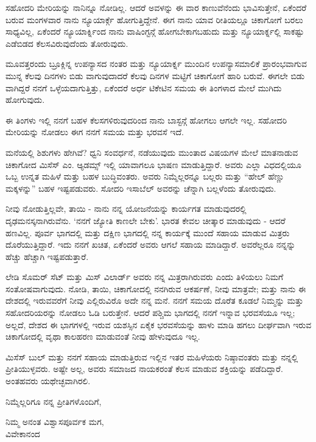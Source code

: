 ಸಹೋದರಿ ಮೇರಿಯನ್ನು ನಾನಿನ್ನೂ ನೋಡಿಲ್ಲ. ಆದರೆ ಅವಳನ್ನು ಈ ವಾರ ಕಾಣುವೆನೆಂದು ಭಾವಿಸುತ್ತೇನೆ, ಏಕೆಂದರೆ ಬರುವ ಮಂಗಳವಾರ ನಾನು ನ್ಯೂಯಾರ್ಕ್ಗೆ ಹೋಗುತ್ತಿದ್ದೇನೆ. ಈಗ ನಾನು ಯಾವ ರೀತಿಯಲ್ಲೂ ಚಿಕಾಗೋಗೆ ಬರಲು ಸಾಧ್ಯವಿಲ್ಲ, ಏಕೆಂದರೆ ನ್ಯೂಯಾರ್ಕ್ನಿಂದ ನಾನು ವಾಷಿಂಗ್ಟನ್ಗೆ ಹೋಗಬೇಕಾಗಬಹುದು ಮತ್ತು ನ್ಯೂಯಾರ್ಕ್ನಲ್ಲಿ ಸಾಕಷ್ಟು ಎಡೆಬಿಡದ ಕೆಲಸವಿರುವುದೆಂದು ತೋರುವುದು.

ಮೂವತ್ತರಂದು ಬ್ರೂಕ್ಲಿನ್ನ ಉಪನ್ಯಾಸದ ನಂತರ ಮತ್ತು ನ್ಯೂಯಾರ್ಕ್ನ ಮುಂದಿನ ಉಪನ್ಯಾಸಮಾಲಿಕೆ ಪ್ರಾರಂಭವಾಗುವ ಮುನ್ನ ಕೆಲವು ದಿನಗಳು ಬಿಡು ವಾಗುವುದಾದರೆ ಕೆಲವು ದಿನಗಳ ಮಟ್ಟಿಗೆ ಚಿಕಾಗೋಗೆ ಹಾರಿ ಬರುವೆ. ಈಗಲೇ ಬಿಡು ವಾಗಿದ್ದರೆ ನನಗೆ ಒಳ್ಳೆಯದಾಗುತ್ತಿತ್ತು, ಏಕೆಂದರೆ ಅರ್ಧ ಟಿಕೇಟಿನ ಸಮಯ ಈ ತಿಂಗಳಾದ ಮೇಲೆ ಮುಗಿದು ಹೋಗುವುದು.

ಈ ತಿಂಗಳು ಇಲ್ಲಿ ನನಗೆ ಬಹಳ ಕೆಲಸಗಳಿರುವುದರಿಂದ ನಾನು ಬಾಸ್ಟನ್ಗೆ ಹೋಗಲು ಆಗಲೇ ಇಲ್ಲ. ಸಹೋದರಿ ಮೇರಿಯನ್ನು ನೋಡಲು ಈಗ ನನಗೆ ಸಮಯ ಮತ್ತು ಭರವಸೆ ಇದೆ.

ಮನೆಯಲ್ಲಿ ಶಿಶುಗಳು ಹೇಗಿವೆ? ಧ್ವನಿ ಸಂವರ್ಧನೆ, ನಡೆಯುವುದು ಮುಂತಾದ ವಿಷಯಗಳ ಮೇಲೆ ಮಾತನಾಡುವ ಚಿಕಾಗೋದ ಮಿಸೆಸ್ ಎಂ. ಆ್ಯಡಮ್ಸ್ ಇಲ್ಲಿ ಯಾವಾಗಲೂ ಭಾಷಣ ಮಾಡುತ್ತಿದ್ದಾರೆ. ಅವರು ಎಲ್ಲಾ ವಿಧದಲ್ಲಿಯೂ ಒಬ್ಬ ಉನ್ನತ ಮಹಿಳೆ ಮತ್ತು ಬಹಳ ಬುದ್ಧಿವಂತರು. ಅವರು ನಿಮ್ಮೆಲ್ಲರನ್ನೂ ಬಲ್ಲರು ಮತ್ತು “ಹೇಲ್ ಹೆಣ್ಣು ಮಕ್ಕಳನ್ನು” ಬಹಳ ಇಷ್ಟಪಡುವರು. ಸೋದರಿ ಇಸಾಬೆಲ್ ಅವರನ್ನು ಚೆನ್ನಾಗಿ ಬಲ್ಲಳೆಂದು ತೋರುವುದು.

ನೀವು ನೋಡುತ್ತಿಲ್ಲವೇ, ತಾಯಿ - ನಾನು ನನ್ನ ಯೋಜನೆಯನ್ನು ಕಾರ್ಯಗತ ಮಾಡುವುದರಲ್ಲಿ ದೃಢಮನಸ್ಕನಾಗಿರುವೆನು. ‘ನನಗೆ ಜ್ಯೋತಿ ಕಾಣಲೇ ಬೇಕು’. ಭಾರತ ಕೇವಲ ಚೀತ್ಕಾರ ಮಾಡುವುದು - ಆದರೆ ಹಣವಿಲ್ಲ. ಪೂರ್ವ ಭಾಗದಲ್ಲಿ ಮತ್ತು ದಕ್ಷಿಣ ಭಾಗದಲ್ಲಿ ನನ್ನ ಕಾರ್ಯಕ್ಕೆ ಮುಂದೆ ಸಹಾಯ ಮಾಡುವ ಮಿತ್ರರು ದೊರೆಯುತ್ತಿದ್ದಾರೆ. ಇದು ನನಗೆ ಖಚಿತ, ಏಕೆಂದರೆ ಅವರು ಆಗಲೆ ಸಹಾಯ ಮಾಡಿದ್ದಾರೆ. ಅವರೆಲ್ಲರೂ ನನ್ನನ್ನು ಹೆಚ್ಚು ಹೆಚ್ಚಾಗಿ ಇಷ್ಟಪಡುತ್ತಾರೆ.

ಲೇಡಿ ಸೊಮರ್ ಸೆಟ್ ಮತ್ತು ಮಿಸ್ ವಿಲಾರ್ಡ್ ಅವರು ನನ್ನ ಮಿತ್ರರಾಗಿರುವರು ಎಂದು ತಿಳಿಯಲು ನಿಮಗೆ ಸಂತೋಷವಾಗುವುದು. ನೋಡಿ, ತಾಯಿ, ಚಿಕಾಗೋದಲ್ಲಿ ನನಗಿರುವ ಆಕರ್ಷಣೆ, ನೀವು ಮಾತ್ರವೇ; ಮತ್ತು ನಾನು ಈ ದೇಶದಲ್ಲಿ ಇರುವವರೆಗೆ ನೀವು ಎಲ್ಲಿರುವಿರೊ ಅದೇ ನನ್ನ ಮನೆ. ನನಗೆ ಸಮಯ ದೊರೆತ ಕೂಡಲೆ ನಿಮ್ಮನ್ನು ಮತ್ತು ಸಹೋದರಿಯರನ್ನು ನೋಡಲು ಓಡಿ ಬರುತ್ತೇನೆ. ಆದರೆ ಪಶ್ಚಿಮ ಭಾಗದಲ್ಲಿ ನನಗೆ ಇನ್ನಾವ ಭರವಸೆಯೂ ಇಲ್ಲ; ಅಲ್ಲದೆ, ದೇಶದ ಈ ಭಾಗಗಳಲ್ಲಿ ಇರುವ ಯಶಸ್ಸಿನ ಏಕೈಕ ಭರವಸೆಯನ್ನು ಹಾಳು ಮಾಡಿ ಹಗಲು ದೀರ್ಘವಾಗಿ ಇರುವ ಚಿಕಾಗೋದಲ್ಲಿ ವೃಥಾ ಕಾಲಹರಣ ಮಾಡುವಂತೆ ನೀವು ಹೇಳುವುದೂ ಇಲ್ಲ.

ಮಿಸೆಸ್ ಬುಲ್ ಮತ್ತು ನನಗೆ ಸಹಾಯ ಮಾಡುತ್ತಿರುವ ಇಲ್ಲಿನ ಇತರ ಮಹಿಳೆಯರು ನಿಷ್ಠಾವಂತರು ಮತ್ತು ನನ್ನಲ್ಲಿ ಪ್ರೀತಿಯುಳ್ಳವರು. ಅಷ್ಟೇ ಅಲ್ಲ, ಅವರು ಸಮಾಜದ ನಾಯಕರಂತೆ ಕೆಲಸ ಮಾಡುವ ಶಕ್ತಿಯನ್ನು ಪಡೆದಿದ್ದಾರೆ. ಅಂತಹವರು ಯಥೇಚ್ಛವಾಗಿರಲಿ.

ನಿಮ್ಮೆಲ್ಲರಿಗೂ ನನ್ನ ಪ್ರೀತಿಗಳೊಂದಿಗೆ,

\begin{flushright}
ನಿಮ್ಮ ಅನಂತ ವಿಶ್ವಾಸಪೂರ್ವಕ ಮಗ,\\ವಿವೇಕಾನಂದ
\end{flushright}

